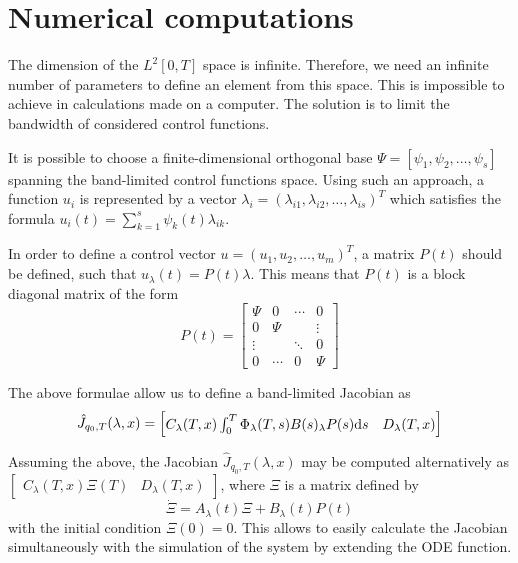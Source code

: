 \section{Numerical computations}
The dimension of the $L^2[0,T]$ space is infinite. Therefore, we need an infinite number of parameters to define an element from this space. This is impossible to achieve in calculations made on a computer. The solution is to limit the bandwidth of considered control functions. 

It is possible to choose a finite-dimensional orthogonal base $\Psi = [ \psi_1, \psi_2, \dots, \psi_s ]$ spanning the band-limited control functions space. 
Using such an approach, a function $u_i$ is represented by a vector 
$\lambda_i = (\lambda_{i1}, \lambda_{i2}, \dots, \lambda_{is})^T$ 
which satisfies the formula $u_i(t) = \sum_{k=1}^s \psi_k(t) \lambda_{ik}$.

In order to define a control vector $u=(u_1, u_2, \dots, u_m)^T$, a matrix $P(t)$ should be defined, such that $u_\lambda(t)=P(t)\lambda$. This means that $P(t)$ is a block diagonal matrix of the form
\begin{equation}
P(t)=\begin{bmatrix}
\Psi & 0 & \cdots & 0\\
0 & \Psi &  & \vdots\\
\vdots &  & \ddots & 0 \\
0 &  \cdots & 0 & \Psi
\end{bmatrix}
\end{equation}

The above formulae allow us to define a band-limited Jacobian as \cite{ecs_ijc}
\begin{equation}
\hat J_{q_0, T}(\lambda, x)=\begin{bmatrix}C_\lambda(T,x)\int_0^T \Phi_\lambda(T,s)B(s)_\lambda P(s)\mathrm{d} s & D_\lambda(T,x)\end{bmatrix}
\end{equation}

Assuming the above, the Jacobian $\hat J_{q_0, T}(\lambda, x)$
may be computed alternatively as\\ $\begin{bmatrix}
C_\lambda(T,x)\Xi(T)& D_\lambda(T,x)
\end{bmatrix}$, where $\Xi$ is a matrix defined by  
\begin{equation}
\dot \Xi = A_\lambda(t)\Xi +B_\lambda(t)P(t)
\end{equation}
with the initial condition $\Xi(0)=0$. %
This allows to easily calculate the Jacobian simultaneously with the simulation
of the system by extending the ODE function.

